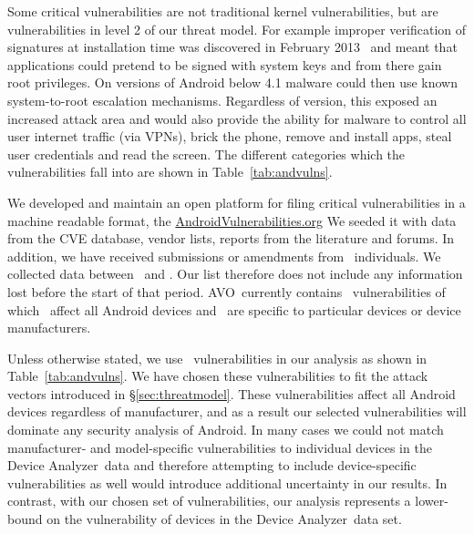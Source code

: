 \documentclass{llncs}
\let\OldTodo\todo
\renewcommand{\todo}{\OldTodo}%
\newcommand{\da}{Device Analyzer}
\newcommand{\avo}{AVO}
\begin{document}
Some critical vulnerabilities are not traditional kernel vulnerabilities, but are vulnerabilities in level 2 of our threat model. For example improper verification of signatures at installation time was discovered in February 2013~\cite{Forristal2013} and meant that applications could pretend to be signed with system keys and from there gain root privileges.
On versions of Android below 4.1 malware could then use known system-to-root escalation mechanisms.
Regardless of version, this exposed an increased attack area and would also provide the ability for malware to control all user internet traffic (via VPNs), brick the phone, remove and install apps, steal user credentials and read the screen.
The different categories which the vulnerabilities fall into are shown in Table~\ref{tab:andvulns}.
\avoTabAndVulns

We developed and maintain an open platform for filing critical vulnerabilities in a machine readable format, the \href{http://androidvulnerabilities.org/}{AndroidVulnerabilities.org}%
We seeded it with data from the CVE database, vendor lists, reports from the literature and forums.
In addition, we have received submissions or amendments from \avoNumSubmitters\ individuals.
We collected data between \avoStartDate\ and \avoEndDate.
Our list therefore does not include any information lost before the start of that period.
\avo\ currently contains \avoNumVulnerabilities\ vulnerabilities of which \avoNumVulnAllAndroid\ affect all Android devices and \avoNumVulnSpecific\ are specific to particular devices or device manufacturers.

Unless otherwise stated, we use \daNumVulnsUsed\ vulnerabilities in our analysis as shown in Table~\ref{tab:andvulns}.
We have chosen these vulnerabilities to fit the attack vectors introduced in \S\ref{sec:threatmodel}.
These vulnerabilities affect all Android devices regardless of manufacturer, and as a result our selected vulnerabilities will dominate any security analysis of Android. 
In many cases we could not match manufacturer- and model-specific vulnerabilities to individual devices in the \da\ data and therefore attempting to include device-specific vulnerabilities as well would introduce additional uncertainty in our results.
In contrast, with our chosen set of vulnerabilities, our analysis represents a lower-bound on the vulnerability of devices in the \da\ data set.
\end{document}
